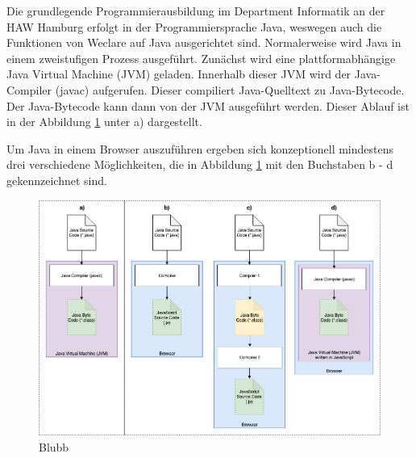 Die grundlegende Programmierausbildung im Department Informatik an der HAW Hamburg erfolgt in der Programmiersprache Java, weswegen auch die Funktionen von Weclare auf Java ausgerichtet sind. Normalerweise wird Java in einem zweistufigen Prozess ausgeführt. Zunächst wird eine plattformabhängige Java Virtual Machine (JVM) geladen. Innerhalb dieser JVM wird der Java-Compiler (javac) aufgerufen. Dieser compiliert Java-Quelltext zu Java-Bytecode. Der Java-Bytecode kann dann von der JVM ausgeführt werden. Dieser Ablauf ist in der Abbildung \ref{abb:java_execution} unter a) dargestellt.

Um Java in einem Browser auszuführen ergeben sich konzeptionell mindestens drei verschiedene Möglichkeiten, die in Abbildung \ref{abb:java_execution} mit den Buchstaben b - d gekennzeichnet sind.

\begin{figure}[H]
    \includegraphics[width=14cm]{chapter/entwurf/bilder/Java_JavaScript_Execution.png}
    \centering
    \caption{Blubb}
    \label{abb:java_execution}
\end{figure}

